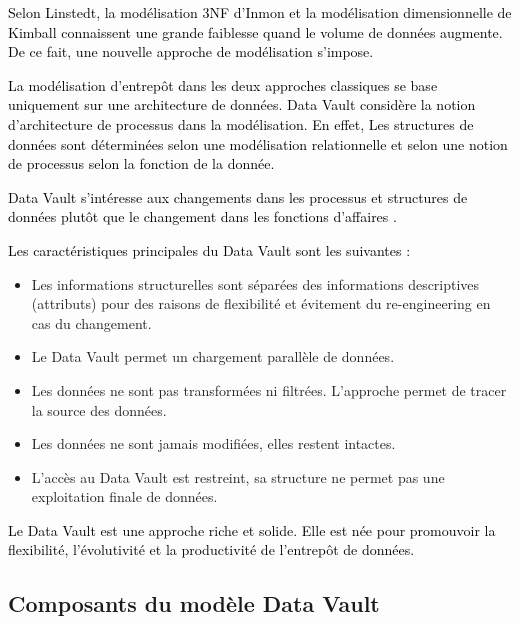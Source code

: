 \documentclass[a4paper,12pt]{report}
\begin{document}
\textcolor{black}{Selon Linstedt, la modélisation 3NF d’Inmon et la modélisation dimensionnelle de Kimball connaissent une grande faiblesse quand le volume de données augmente. De ce fait, une nouvelle approche de modélisation s’impose.}



\textcolor{black}{La modélisation d’entrepôt dans les deux approches classiques se base uniquement sur une architecture de données. Data Vault considère la notion d’architecture de processus dans la modélisation. En effet, Les structures de données sont déterminées selon une modélisation relationnelle et selon une notion de processus selon la fonction de la donnée.\citep{4}}


\textcolor{black}{Data Vault s’intéresse aux changements dans les processus et structures de données plutôt que le changement dans les fonctions d’affaires \citep{4}.}


\textcolor{black}{Les caractéristiques principales du Data Vault sont les suivantes \citep{4} :}

\begin{itemize}

\item Les informations structurelles sont séparées des informations descriptives (attributs) pour des raisons de flexibilité et évitement du re-engineering en cas du changement.

\item 	Le Data Vault permet un chargement parallèle de données.

\item 	Les données ne sont pas transformées ni filtrées. L’approche permet de tracer la source des données.

\item 	Les données ne sont jamais modifiées, elles restent intactes.

\item	L’accès au Data Vault est restreint, sa structure ne permet pas une exploitation finale de données.

\end{itemize}

\textcolor{black}{Le Data Vault est une approche riche et solide. Elle est née pour promouvoir la flexibilité, l’évolutivité et la productivité de l’entrepôt de données.}

\subsection{Composants du modèle Data Vault}
\end{document}
